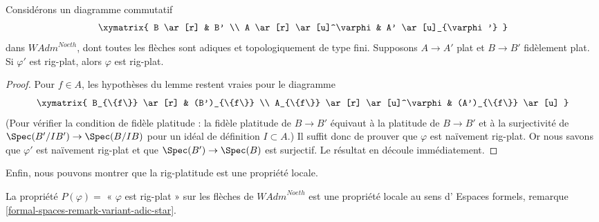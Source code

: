 \begin{lemma}
\label{lemma-rig-flat-local-down}
Considérons un diagramme commutatif
$$
\xymatrix{
B \ar[r] & B' \\
A \ar[r] \ar[u]^\varphi & A' \ar[u]_{\varphi'}
}
$$
dans $\textit{WAdm}^{Noeth}$, dont toutes les flèches sont adiques et
topologiquement de type fini. Supposons $A \to A'$ plat et $B \to B'$ fidèlement plat.
Si $\varphi'$ est rig-plat, alors $\varphi$ est rig-plat.
\end{lemma}

\begin{proof}
Pour $f \in A$, les hypothèses du lemme restent vraies pour le diagramme
$$
\xymatrix{
B_{\{f\}} \ar[r] & (B')_{\{f\}} \\
A_{\{f\}} \ar[r] \ar[u]^\varphi & (A')_{\{f\}} \ar[u]
}
$$
(Pour vérifier la condition de fidèle platitude : la fidèle platitude
de $B \to B'$ équivaut à la platitude de $B \to B'$ et à la
surjectivité de $\Spec(B'/IB') \to \Spec(B/IB)$
pour un idéal de définition $I \subset A$.)
Il suffit donc de prouver que $\varphi$ est naïvement rig-plat.
Or nous savons que $\varphi'$ est naïvement rig-plat et
que $\Spec(B') \to \Spec(B)$ est surjectif. Le
résultat en découle immédiatement.
\end{proof}

\noindent
Enfin, nous pouvons montrer que la rig-platitude est une propriété locale.

\begin{lemma}
\label{lemma-rig-flat-axioms}
La propriété $P(\varphi)=$ « $\varphi$ est rig-plat » sur les flèches
de $\textit{WAdm}^{Noeth}$ est une propriété locale au sens d'
Espaces formels, remarque \ref{formal-spaces-remark-variant-adic-star}.
\end{lemma}

